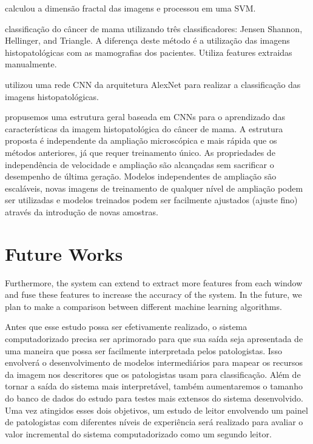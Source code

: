 \documentclass[preprint,12pt,authoryear]{elsarticle}
\begin{document}
\cite{CHAN2016} calculou a dimensão fractal das imagens e processou em uma SVM.

\cite{KORKMAZ2016} classificação do câncer de mama utilizando três classificadores: Jensen Shannon, Hellinger, and Triangle. A diferença deste método é a utilização das imagens histopatológicas com as mamografias dos pacientes. Utiliza features extraidas manualmente.

\cite{SPANHOL2016} utilizou uma rede CNN da arquitetura AlexNet para realizar a classificação das imagens histopatológicas.

\cite{BAYRANOGLU2016} propusemos uma estrutura geral baseada em CNNs para o aprendizado das características da imagem histopatológica do câncer de mama. A estrutura proposta é independente da ampliação microscópica e mais rápida que os métodos anteriores, já que requer treinamento único. As propriedades de independência de velocidade e ampliação são alcançadas sem sacrificar o desempenho de última geração. Modelos independentes de ampliação são escaláveis, novas imagens de treinamento de qualquer nível de ampliação podem ser utilizadas e modelos treinados podem ser facilmente ajustados (ajuste fino) através da introdução de novas amostras.

\pagebreak
\section{Future Works}

Furthermore, the system can extend to extract more features from each window and fuse these features to increase the accuracy of the system. In the future, we plan to make a comparison between different machine learning algorithms. \citep{ALQUDAH2019}

Antes que esse estudo possa ser efetivamente realizado, o sistema computadorizado precisa ser aprimorado para que sua saída seja apresentada de uma maneira que possa ser facilmente interpretada pelos patologistas. Isso envolverá o desenvolvimento de modelos intermediários para mapear os recursos da imagem nos descritores que os patologistas usam para classificação. Além de tornar a saída do sistema mais interpretável, também aumentaremos o tamanho do banco de dados do estudo para testes mais extensos do sistema desenvolvido. Uma vez atingidos esses dois objetivos, um estudo de leitor envolvendo um painel de patologistas com diferentes níveis de experiência será realizado para avaliar o valor incremental do sistema computadorizado como um segundo leitor. \citep{DUNDAR2011}
\end{document}
